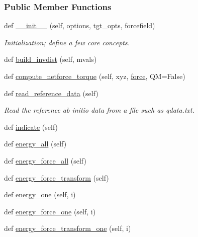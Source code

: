 \subsubsection*{Public Member Functions}
\begin{DoxyCompactItemize}
\item 
def \hyperlink{classsrc_1_1abinitio_1_1AbInitio_a05142b8321814feceac1a39ab338615e}{\+\_\+\+\_\+init\+\_\+\+\_\+} (self, options, tgt\+\_\+opts, forcefield)
\begin{DoxyCompactList}\small\item\em Initialization; define a few core concepts. \end{DoxyCompactList}\item 
def \hyperlink{classsrc_1_1abinitio_1_1AbInitio_a41dad975f9ae658f5ba75ee60f71c70b}{build\+\_\+invdist} (self, mvals)
\item 
def \hyperlink{classsrc_1_1abinitio_1_1AbInitio_a47d99a795699735638d55c5162ef1878}{compute\+\_\+netforce\+\_\+torque} (self, xyz, \hyperlink{classsrc_1_1abinitio_1_1AbInitio_ab026c75ec6db07cfe829718e944a871b}{force}, QM=False)
\item 
def \hyperlink{classsrc_1_1abinitio_1_1AbInitio_afacfa5d84fb6638dcfad3bff7f14d48f}{read\+\_\+reference\+\_\+data} (self)
\begin{DoxyCompactList}\small\item\em Read the reference ab initio data from a file such as qdata.\+txt. \end{DoxyCompactList}\item 
def \hyperlink{classsrc_1_1abinitio_1_1AbInitio_ac1ecf4fd0ddfbd22d9baee6629ed1e27}{indicate} (self)
\item 
def \hyperlink{classsrc_1_1abinitio_1_1AbInitio_ad034ceabe8571ffd60c3c8f33cb86c85}{energy\+\_\+all} (self)
\item 
def \hyperlink{classsrc_1_1abinitio_1_1AbInitio_a123b55e22a49de1e3ea413d6c0de7837}{energy\+\_\+force\+\_\+all} (self)
\item 
def \hyperlink{classsrc_1_1abinitio_1_1AbInitio_a2a9c1db3829a4dd66229719fa8e3685a}{energy\+\_\+force\+\_\+transform} (self)
\item 
def \hyperlink{classsrc_1_1abinitio_1_1AbInitio_a49f95a1162a42d38a96c8484006d7052}{energy\+\_\+one} (self, i)
\item 
def \hyperlink{classsrc_1_1abinitio_1_1AbInitio_ace684b84061d90041fc1dac98cd2ce58}{energy\+\_\+force\+\_\+one} (self, i)
\item 
def \hyperlink{classsrc_1_1abinitio_1_1AbInitio_a21993fd11a62021d9aa0fe1f4eecd4ad}{energy\+\_\+force\+\_\+transform\+\_\+one} (self, i)

\end{DoxyCompactItemize}
